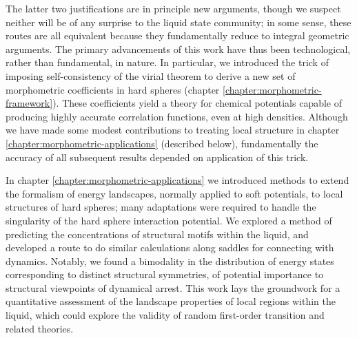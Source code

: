\documentclass[11pt,twoside]{report}
\begin{document}
The latter two justifications are in principle new arguments, though we suspect neither will be of any surprise to the liquid state community; in some sense, these routes are all equivalent because they fundamentally reduce to integral geometric arguments.
The primary advancements of this work have thus been technological, rather than fundamental, in nature.
In particular, we introduced the trick of imposing self-consistency of the virial theorem to derive a new set of morphometric coefficients in hard spheres (chapter \ref{chapter:morphometric-framework}).
These coefficients yield a theory for chemical potentials capable of producing highly accurate correlation functions, even at high densities.
Although we have made some modest contributions to treating local structure in chapter \ref{chapter:morphometric-applications} (described below), fundamentally the accuracy of all subsequent results depended on application of this trick.

In chapter \ref{chapter:morphometric-applications} we introduced methods to extend the formalism of energy landscapes, normally applied to soft potentials, to local structures of hard spheres; many adaptations were required to handle the singularity of the hard sphere interaction potential.
We explored a method of predicting the concentrations of structural motifs within the liquid, and developed a route to do similar calculations along saddles%
for connecting with dynamics.
Notably, we found a bimodality in the distribution of energy states corresponding to distinct structural symmetries, of potential importance to structural viewpoints of dynamical arrest.
This work lays the groundwork for a quantitative assessment of the landscape properties of local regions within the liquid, which could explore the validity of random first-order transition and related theories.
\end{document}
